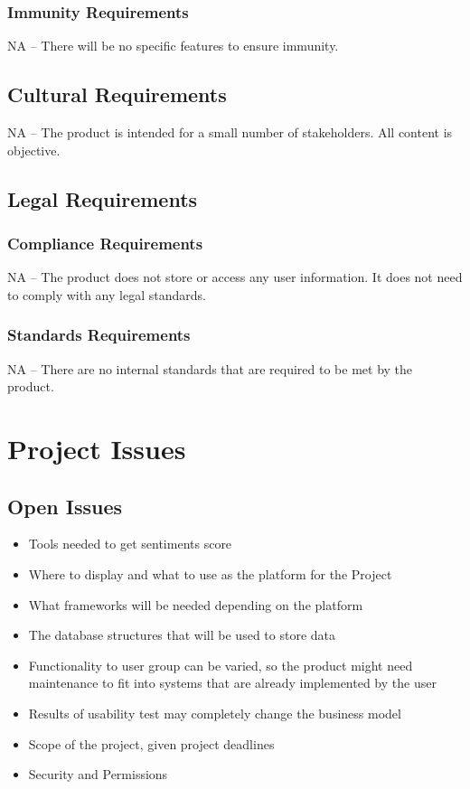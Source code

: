 \documentclass[12pt]{article}
\begin{document}
\subsubsection{Immunity Requirements}
NA -- There will be no specific features to ensure immunity.


\subsection{Cultural Requirements} %
NA -- The product is intended for a small number of stakeholders. All content is objective.

\subsection{Legal Requirements} %
\subsubsection{Compliance Requirements}
NA -- The product does not store or access any user information. It does not need to comply with any legal standards.

\subsubsection{Standards Requirements}
NA -- There are no internal standards that are required to be met by the product.

\newpage
\section{Project Issues}


\subsection{Open Issues} 
\begin{itemize}
\item Tools needed to get sentiments score
\item Where to display and what to use as the platform for the Project
\item What frameworks will be needed depending on the platform
\item The database structures that will be used to store data
\item Functionality to user group can be varied, so the product might need maintenance to fit into systems that are already implemented by the user
\item Results of usability test may completely change the business model
\item Scope of the project, given project deadlines
\item Security and Permissions
\end{itemize}
\end{document}
